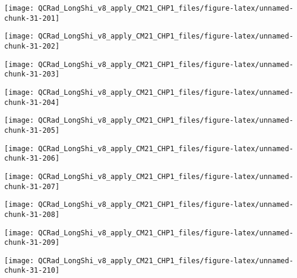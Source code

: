 \documentclass[
  10pt,
  a4paper,oneside]{article}
\begin{document}
\begin{center}\texttt{[image: QCRad\_LongShi\_v8\_apply\_CM21\_CHP1\_files/figure-latex/unnamed-chunk-31-201]} \end{center}

\begin{center}\texttt{[image: QCRad\_LongShi\_v8\_apply\_CM21\_CHP1\_files/figure-latex/unnamed-chunk-31-202]} \end{center}

\begin{center}\texttt{[image: QCRad\_LongShi\_v8\_apply\_CM21\_CHP1\_files/figure-latex/unnamed-chunk-31-203]} \end{center}

\begin{center}\texttt{[image: QCRad\_LongShi\_v8\_apply\_CM21\_CHP1\_files/figure-latex/unnamed-chunk-31-204]} \end{center}

\begin{center}\texttt{[image: QCRad\_LongShi\_v8\_apply\_CM21\_CHP1\_files/figure-latex/unnamed-chunk-31-205]} \end{center}

\begin{center}\texttt{[image: QCRad\_LongShi\_v8\_apply\_CM21\_CHP1\_files/figure-latex/unnamed-chunk-31-206]} \end{center}

\begin{center}\texttt{[image: QCRad\_LongShi\_v8\_apply\_CM21\_CHP1\_files/figure-latex/unnamed-chunk-31-207]} \end{center}

\begin{center}\texttt{[image: QCRad\_LongShi\_v8\_apply\_CM21\_CHP1\_files/figure-latex/unnamed-chunk-31-208]} \end{center}

\begin{center}\texttt{[image: QCRad\_LongShi\_v8\_apply\_CM21\_CHP1\_files/figure-latex/unnamed-chunk-31-209]} \end{center}

\begin{center}\texttt{[image: QCRad\_LongShi\_v8\_apply\_CM21\_CHP1\_files/figure-latex/unnamed-chunk-31-210]} \end{center}
\end{document}
